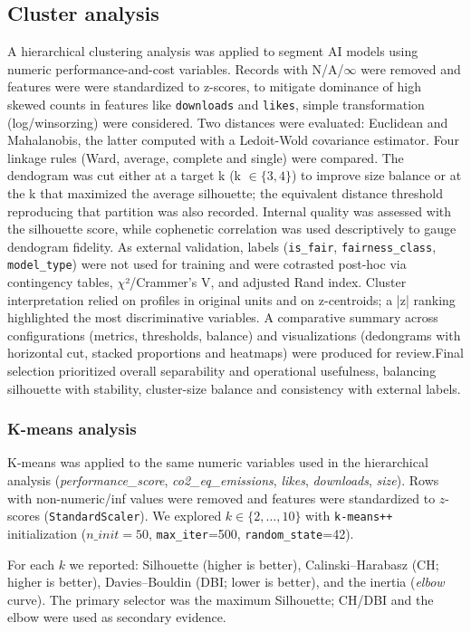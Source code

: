 \documentclass[journal]{IEEEtran}
\begin{document}
	\subsection{Cluster analysis}
	\label{methodology:cluanal}
	A hierarchical clustering analysis was applied to segment AI models using numeric performance-and-cost variables. Records with N/A/$\infty$ were removed and features were were standardized to z-scores, to mitigate dominance of high skewed counts in features like \texttt{downloads} and \texttt{likes}, simple transformation (log/winsorzing) were considered. Two distances were evaluated: Euclidean and Mahalanobis, the latter computed with a Ledoit-Wold covariance estimator. Four linkage rules (Ward, average, complete and single) were compared.
	The dendogram was cut either at a target k (k $\in{\{3,4\}}$) to improve size balance or at the k that maximized the average silhouette; the equivalent distance threshold reproducing that partition was also recorded. Internal quality was assessed with the silhouette score, while cophenetic correlation was used descriptively to gauge dendogram fidelity. As external validation, labels (\texttt{is\_fair}, \texttt{fairness\_class}, \texttt{model\_type}) were not used for training and were cotrasted post-hoc via contingency tables, $\chi$²/Crammer's V, and adjusted Rand index.
	Cluster interpretation relied on profiles in original units and on z-centroids; a |z| ranking highlighted the most discriminative variables. A comparative summary across configurations (metrics, thresholds, balance) and visualizations (dedongrams with horizontal cut, stacked proportions and heatmaps) were produced for review.Final selection prioritized overall separability and operational usefulness, balancing silhouette with stability, cluster-size balance and consistency with external labels. 

\subsubsection*{K-means analysis}
K-means was applied to the same numeric variables used in the hierarchical analysis
(\textit{performance\_score}, \textit{co2\_eq\_emissions}, \textit{likes}, \textit{downloads}, \textit{size}).
Rows with non-numeric/inf values were removed and features were standardized to $z$-scores
(\texttt{StandardScaler}). We explored $k\in\{2,\ldots,10\}$ with \texttt{k-means++}
initialization ($n\_init=50$, \texttt{max\_iter}=500, \texttt{random\_state}=42).

For each $k$ we reported: Silhouette (higher is better), Calinski–Harabasz (CH; higher is better),
Davies–Bouldin (DBI; lower is better), and the inertia (\emph{elbow} curve).
The primary selector was the maximum Silhouette; CH/DBI and the elbow were used as
secondary evidence.
\end{document}

